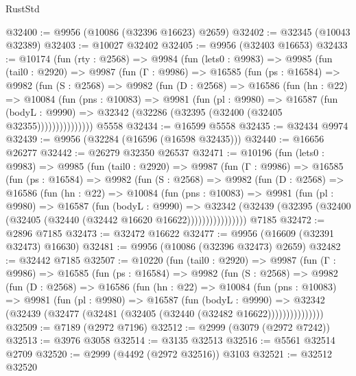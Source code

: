 \begin{lexlean}{RustStd}
\begin{coremodule}
@32400 := @9956 (@10086 (@32396 @16623) @2659)
@32402 := @32345 (@10043 @32389)
@32403 := @10027 @32402
@32405 := @9956 (@32403 @16653)
@32433 := @10174
    (fun (rty : @2568) =>
    @9984
      (fun (lets0 : @9983) =>
      @9985
        (fun (tail0 : @2920) =>
        @9987
          (fun (Γ : @9986) =>
          @16585
            (fun (ps : @16584) =>
            @9982
              (fun (S : @2568) =>
              @9982
                (fun (D : @2568) =>
                @16586
                  (fun (hn : @22) =>
                  @10084
                    (fun (pns : @10083) =>
                    @9981
                      (fun (pl : @9980) =>
                      @16587
                        (fun (bodyL : @9990) =>
                        @32342 (@32286 (@32395 (@32400 (@32405 @32355)))))))))))))))
    @5558
@32434 := @16599 @5558
@32435 := @32434 @9974
@32439 := @9956 (@32284 (@16596 (@16598 @32435)))
@32440 := @16656 @26277
@32442 := @26279 @32350 @26537
@32471 := @10196
    (fun (lets0 : @9983) =>
    @9985
      (fun (tail0 : @2920) =>
      @9987
        (fun (Γ : @9986) =>
        @16585
          (fun (ps : @16584) =>
          @9982
            (fun (S : @2568) =>
            @9982
              (fun (D : @2568) =>
              @16586
                (fun (hn : @22) =>
                @10084
                  (fun (pns : @10083) =>
                  @9981
                    (fun (pl : @9980) =>
                    @16587
                      (fun (bodyL : @9990) =>
                      @32342
                        (@32439
                          (@32395 (@32400 (@32405 (@32440 (@32442 @16620 @16622))))))))))))))))
    @7185
@32472 := @2896 @7185
@32473 := @32472 @16622
@32477 := @9956 (@16609 (@32391 @32473) @16630)
@32481 := @9956 (@10086 (@32396 @32473) @2659)
@32482 := @32442 @7185
@32507 := @10220
    (fun (tail0 : @2920) =>
    @9987
      (fun (Γ : @9986) =>
      @16585
        (fun (ps : @16584) =>
        @9982
          (fun (S : @2568) =>
          @9982
            (fun (D : @2568) =>
            @16586
              (fun (hn : @22) =>
              @10084
                (fun (pns : @10083) =>
                @9981
                  (fun (pl : @9980) =>
                  @16587
                    (fun (bodyL : @9990) =>
                    @32342 (@32439 (@32477 (@32481 (@32405 (@32440 (@32482 @16622)))))))))))))))
@32509 := @7189 (@2972 @7196)
@32512 := @2999 (@3079 (@2972 @7242))
@32513 := @3976 @3058
@32514 := @3135 @32513
@32516 := @5561 @32514 @2709
@32520 := @2999 (@4492 (@2972 @32516)) @3103
@32521 := @32512 @32520

\end{coremodule}
\end{lexlean}
